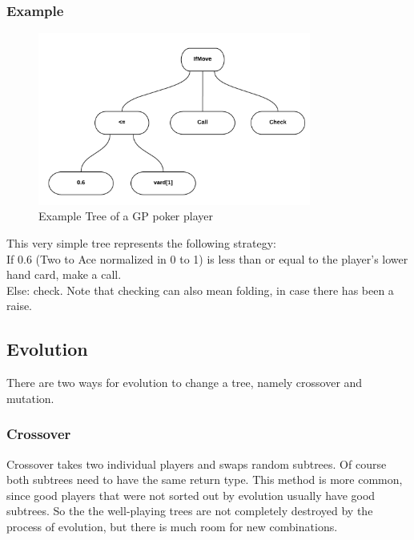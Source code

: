 \documentclass[12pt,fleqn,a4paper]{article}
\begin{document}
\subsubsection{Example}
\begin{figure}[!ht]
\begin{center}
	\includegraphics[width=0.8\textwidth]{tree1.png}
\caption{Example Tree of a GP poker player}
\end{center}
\end{figure}
This very simple tree represents the following strategy:
~\\
If 0.6 (Two to Ace normalized in 0 to 1) is less than or equal to the player's lower hand card, make a call.\\
Else: check. Note that checking can also mean folding, in case there has been a raise.

\subsection{Evolution}
There are two ways for evolution to change a tree, namely crossover and mutation.

\subsubsection{Crossover}
Crossover takes two individual players and swaps random subtrees.
Of course both subtrees need to have the same return type.
This method is more common, since good players that were not sorted out by evolution usually have good subtrees.
So the the well-playing trees are not completely destroyed by the process of evolution, but there is much room for new combinations.
\end{document}
